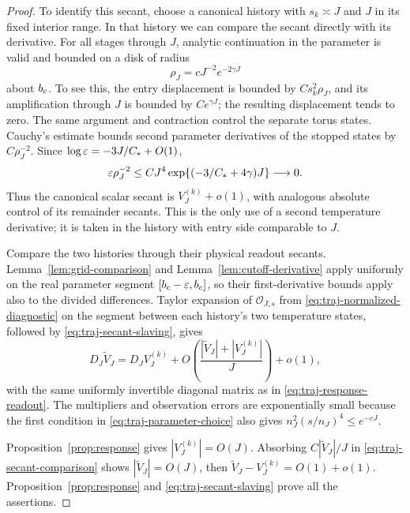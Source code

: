 \begin{proof}
To identify this secant, choose a canonical history with
\(s_k\asymp J\) and \(J\) in its fixed interior range.  In that
history we can compare the secant directly with its derivative.
For all stages through \(J\), analytic continuation in the
parameter is valid and bounded on a disk of radius
\[
 \rho_J=cJ^{-2}e^{-2\gamma J}
\]
about \(b_c\).  To see this, the entry displacement is bounded
by \(Cs_k^2\rho_J\), and its amplification through \(J\)
is bounded by \(Ce^{\gamma J}\); the resulting displacement
tends to zero.  The same argument and contraction control the
separate torus states.  Cauchy's estimate bounds second parameter
derivatives of the stopped states by \(C\rho_J^{-2}\).
Since \(\log\varepsilon=-3J/C_*+O(1)\),
\begin{equation}\label{eq:traj-cauchy-error}
 \varepsilon\rho_J^{-2}
 \le CJ^4\exp\{(-3/C_*+4\gamma)J\}
 \longrightarrow0.
\end{equation}
Thus the canonical scalar secant is
\(V_J^{(k)}+o(1)\), with analogous absolute control of its
remainder secants.  This is the only use of a second temperature
derivative; it is taken in the history with entry side comparable
to \(J\).

Compare the two histories through their physical readout secants.
Lemma~\ref{lem:grid-comparison} and
Lemma~\ref{lem:cutoff-derivative} apply uniformly on the real
parameter segment \([b_c-\varepsilon,b_c]\), so their first-derivative
bounds apply also to the divided differences.  Taylor expansion of
\(\mathscr O_{J,s}\) from \eqref{eq:traj-normalized-diagnostic}
on the segment between each history's two temperature states,
followed by \eqref{eq:traj-secant-slaving}, gives
\begin{equation}\label{eq:traj-secant-comparison}
 D_J\widetilde V_J
   =D_JV_J^{(k)}
       +O\!\left(
           \frac{|\widetilde V_J|+|V_J^{(k)}|}{J}\right)+o(1),
\end{equation}
with the same uniformly invertible diagonal matrix as in
\eqref{eq:traj-response-readout}.  The multipliers and observation
errors are exponentially small because the first condition in
\eqref{eq:traj-parameter-choice} also gives
\(n_J^2(s/n_J)^4\le e^{-cJ}\).

Proposition~\ref{prop:response} gives \(|V_J^{(k)}|=O(J)\).
Absorbing \(C|\widetilde V_J|/J\) in
\eqref{eq:traj-secant-comparison} shows
\(|\widetilde V_J|=O(J)\), then
\(\widetilde V_J-V_J^{(k)}=O(1)+o(1)\).
Proposition~\ref{prop:response} and
\eqref{eq:traj-secant-slaving} prove all the assertions.
\end{proof}

